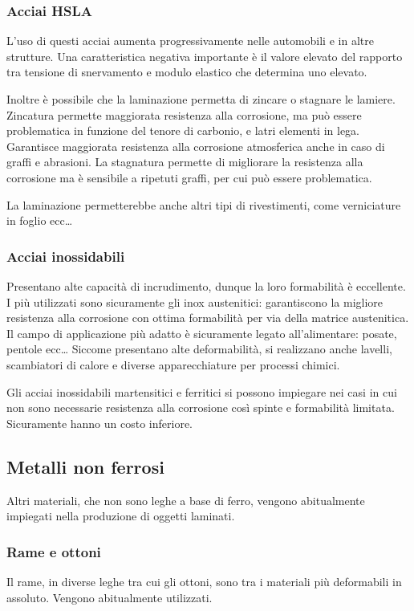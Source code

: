 \subsubsection{Acciai HSLA}
L'uso di questi acciai aumenta progressivamente nelle automobili e in altre strutture. Una caratteristica negativa importante è il valore elevato del rapporto tra tensione di snervamento e modulo elastico che determina uno  elevato.

Inoltre è possibile che la laminazione permetta di zincare o stagnare le lamiere.
Zincatura permette maggiorata resistenza alla corrosione, ma può essere problematica in funzione del tenore di carbonio, e latri elementi in lega. Garantisce maggiorata resistenza alla corrosione atmosferica anche in caso di graffi e abrasioni.
La stagnatura permette di migliorare la resistenza alla corrosione ma è sensibile a ripetuti graffi, per cui può essere problematica.

La laminazione permetterebbe anche altri tipi di rivestimenti, come verniciature in foglio ecc\dots

\subsubsection{Acciai inossidabili}
Presentano alte capacità di incrudimento, dunque la loro formabilità è eccellente.
I più utilizzati sono sicuramente gli inox austenitici: garantiscono la migliore resistenza alla corrosione con ottima formabilità per via della matrice austenitica.
Il campo di applicazione più adatto è sicuramente legato all'alimentare: posate, pentole ecc\dots
Siccome presentano alte deformabilità, si realizzano anche lavelli, scambiatori di calore e diverse apparecchiature per processi chimici.

Gli acciai inossidabili martensitici e ferritici si possono impiegare nei casi in cui non sono necessarie resistenza alla corrosione così spinte e formabilità limitata.
Sicuramente hanno un costo inferiore.

\subsection{Metalli non ferrosi}
Altri materiali, che non sono leghe a base di ferro, vengono abitualmente impiegati nella produzione di oggetti laminati.

\subsubsection{Rame e ottoni}
Il rame, in diverse leghe tra cui gli ottoni, sono tra i materiali più deformabili in assoluto. Vengono abitualmente utilizzati.

